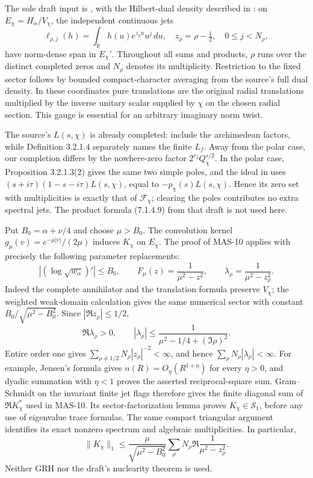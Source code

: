 \documentclass[11pt,a4paper]{article}
\newcommand{\R}{\mathbb R}
\newcommand{\fid}[1]{\textsf{#1}}
\begin{document}
The sole draft input is \cite[Theorem 10.2.2.1, (10.2.2.4)--(10.2.2.6), p.~446]{masullo}, with the Hilbert-dual density described in \cite[Remark 10.2.1.2, pp.~440--441]{masullo}: on $E_\chi=H_\alpha/V_\chi$, the independent continuous jets
\[
 \ell_{\rho,j}(h)=\int_\R h(u)e^{z_\rho u}u^j\,du,
 \quad z_\rho=\rho-\tfrac12,\quad 0\le j<N_\rho,
\]
have norm-dense span in $E_\chi'$. Throughout all sums and products, $\rho$ runs over the distinct completed zeros and $N_\rho$ denotes its multiplicity. Restriction to the fixed sector follows by bounded compact-character averaging from the source's full dual density. In these coordinates pure translations are the original radial translations multiplied by the inverse unitary scalar supplied by $\chi$ on the chosen radial section. This gauge is essential for an arbitrary imaginary norm twist.

The source's $L(s,\chi)$ is already completed: \cite[Definition 3.2.1.2 and (3.2.1.2)--(3.2.1.5), p.~123]{masullo} include the archimedean factors, while Definition 3.2.1.4 separately names the finite $L_f$. Away from the polar case, our completion differs by the nowhere-zero factor $2^{r_2}Q_\chi^{s/2}$. In the polar case, Proposition 3.2.1.3(2) gives the same two simple poles, and the ideal in \cite[Theorem 7.1.4.2(1), p.~326]{masullo} uses $(s+i\tau)(1-s-i\tau)L(s,\chi)$, equal to $-p_\chi(s)L(s,\chi)$. Hence its zero set with multiplicities is exactly that of $\mathcal F_\chi$; clearing the poles contributes no extra spectral jets. The product formula (7.1.4.9) from that draft is not used here.

Put $B_0=\alpha+\nu/4$ and choose $\mu>B_0$. The convolution kernel $g_\mu(v)=e^{-\mu|v|}/(2\mu)$ induces $K_\chi$ on $E_\chi$. The proof of \fid{MAS-10} applies with precisely the following parameter replacements:
\[
 |(\log\sqrt{w_\alpha})'|\le B_0,\qquad
 F_\mu(z)=\frac1{\mu^2-z^2},\qquad
 \lambda_\rho=\frac1{\mu^2-z_\rho^2}.
\]
Indeed the complete annihilator and the translation formula preserve $V_\chi$; the weighted weak-domain calculation gives the same numerical sector with constant $B_0/\sqrt{\mu^2-B_0^2}$. Since $|\Re z_\rho|\le1/2$,
\[
 \Re\lambda_\rho>0,\qquad
 |\lambda_\rho|\le\frac1{\mu^2-1/4+(\Im\rho)^2}.
\]
Entire order one gives $\sum_{\rho\ne1/2}N_\rho|z_\rho|^{-2}<\infty$, and hence $\sum_\rho N_\rho|\lambda_\rho|<\infty$. For example, Jensen's formula gives $n(R)=O_\eta(R^{1+\eta})$ for every $\eta>0$, and dyadic summation with $\eta<1$ proves the asserted reciprocal-square sum. Gram--Schmidt on the invariant finite jet flags therefore gives the finite diagonal sum of $\Re K_\chi^*$ used in \fid{MAS-10}. Its sector-factorization lemma proves $K_\chi\in\mathcal S_1$, before any use of eigenvalue trace formulas. The same compact triangular argument identifies its exact nonzero spectrum and algebraic multiplicities. In particular,
\[
 \|K_\chi\|_1\le\frac{\mu}{\sqrt{\mu^2-B_0^2}}
 \sum_\rho N_\rho\Re\frac1{\mu^2-z_\rho^2}.
\]
Neither GRH nor the draft's nuclearity theorem is used.
\end{document}
